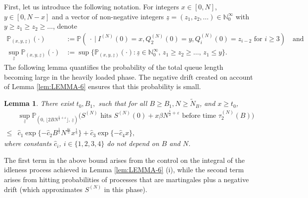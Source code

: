 \documentclass[11pt, reqno]{article}
\newtheorem{lemma}[theorem]{Lemma}
\numberwithin{equation}{section}
\numberwithin{theorem}{section}
\newcommand\blue[1]{#1}
\begin{document}
First, let us introduce the following notation.
For integers $x \in [0,N]$, $y \in [0, N-x]$ and a vector of non-negative integers $\underline{z} = (z_1,z_2,\dots) \in \mathbb{N}_0^{\infty}$ with $y \ge z_1 \ge z_2 \ge \dots$, denote 
\begin{align*}
    \mathbb{P}_{(x,y,\underline{z})}(\cdot) &:=\mathbb{P}(\ \cdot\ |\ I^{(N)}(0)=x,Q^{(N)}_2(0)=y, Q^{(N)}_i(0)= z_{i-2} \text{ for } i \ge 3)\quad \text{and}\\
    \sup_{\underline{z}} \mathbb{P}_{(x,y,\underline{z})}(\cdot) &:= \sup\Big\{ \mathbb{P}_{(x,y,\underline{z})}(\cdot):  \underline{z} \in \mathbb{N}_0^{\infty}, \, z_1 \ge z_2 \ge \dots, \, z_1 \le y\Big\}.
\end{align*}
\blue{The following lemma quantifies the probability of the total queue length becoming large in the heavily loaded phase. The negative drift created on account of Lemma \ref{lem:LEMMA-6} ensures that this probability is small.}
\begin{lemma}\label{lem:S-hit-time}
There exist $t_0,B_1,$ such that for all $B\geq B_1, N\geq \tilde N_B$, and $x\geq t_0$,
    \begin{align*}
        & \sup_{\underline{z}} \mathbb{P}_{(0, \, \lfloor 2BN^{\frac{1}{2}+\varepsilon} \rfloor, \,\underline{z})}\big(S^{(N)}\text{ hits }S^{(N)}(0)+x\beta N^{\frac{1}{2}+\varepsilon}\text{ before time }\tau_2^{(N)}(B)\big)\\
        \leq & \hat{c}_1\exp \{-\hat{c}_2 B^{\frac{1}{5}}N^{\frac{4\varepsilon}{5}}x^{\frac{1}{5}}\}+\hat{c}_3\exp \{-\hat{c}_4x\},
    \end{align*}
    where constants $\hat{c}_i$, $i\in \{1,2,3,4\}$ do not depend on $B$ and $N$.
\end{lemma}
\blue{The first term in the above bound arises from the control on the integral of the idleness process achieved in Lemma \ref{lem:LEMMA-6} (i), while the second term arises from hitting probabilities of processes that are martingales plus a negative drift (which approximates $S^{(N)}$ in this phase).}
\end{document}
